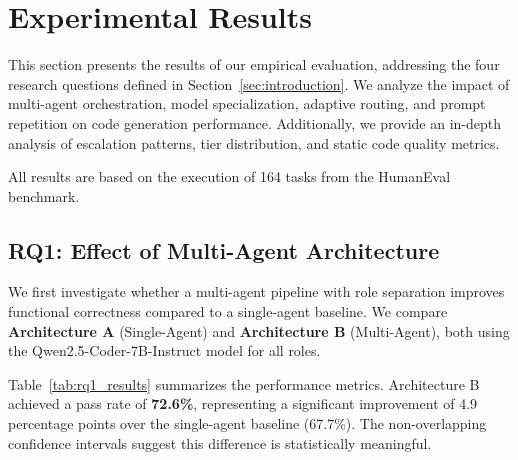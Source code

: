\section{Experimental Results}
\label{sec:experimental_results}

This section presents the results of our empirical evaluation, addressing the four research questions defined in Section~\ref{sec:introduction}. We analyze the impact of multi-agent orchestration, model specialization, adaptive routing, and prompt repetition on code generation performance. Additionally, we provide an in-depth analysis of escalation patterns, tier distribution, and static code quality metrics.

All results are based on the execution of 164 tasks from the HumanEval benchmark. 
\subsection{RQ1: Effect of Multi-Agent Architecture}
\label{subsec:rq1_results}

We first investigate whether a multi-agent pipeline with role separation improves functional correctness compared to a single-agent baseline. We compare \textbf{Architecture A} (Single-Agent) and \textbf{Architecture B} (Multi-Agent), both using the Qwen2.5-Coder-7B-Instruct model for all roles.

Table~\ref{tab:rq1_results} summarizes the performance metrics. Architecture B achieved a pass rate of \textbf{72.6\%}, representing a significant improvement of 4.9 percentage points over the single-agent baseline (67.7\%). The non-overlapping confidence intervals suggest this difference is statistically meaningful.

\begin{table}[ht]
    \centering
    \caption{Comparison of Single-Agent (A) vs Multi-Agent (B) Architectures.}
    \label{tab:rq1_results}
\end{table}

